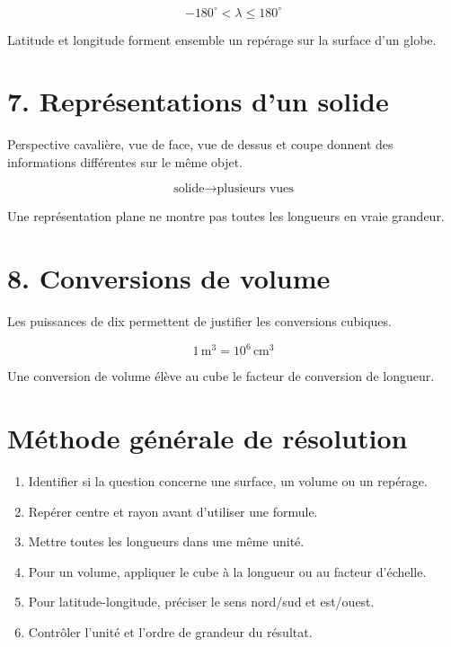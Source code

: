 \[
-180^\circ<\lambda\le180^\circ
\]

\begin{exemple}
Latitude et longitude forment ensemble un repérage sur la surface d’un globe.
\end{exemple}

\section{7. Représentations d’un solide}
Perspective cavalière, vue de face, vue de dessus et coupe donnent des informations différentes sur le même objet.

\[
\text{solide}\rightarrow\text{plusieurs vues}
\]

\begin{exemple}
Une représentation plane ne montre pas toutes les longueurs en vraie grandeur.
\end{exemple}

\section{8. Conversions de volume}
Les puissances de dix permettent de justifier les conversions cubiques.

\[
1\,\text{m}^3=10^6\,\text{cm}^3
\]

\begin{exemple}
Une conversion de volume élève au cube le facteur de conversion de longueur.
\end{exemple}

\section{Méthode générale de résolution}
\begin{methode}
\begin{enumerate}
\item Identifier si la question concerne une surface, un volume ou un repérage.
\item Repérer centre et rayon avant d’utiliser une formule.
\item Mettre toutes les longueurs dans une même unité.
\item Pour un volume, appliquer le cube à la longueur ou au facteur d’échelle.
\item Pour latitude-longitude, préciser le sens nord/sud et est/ouest.
\item Contrôler l’unité et l’ordre de grandeur du résultat.
\end{enumerate}
\end{methode}

